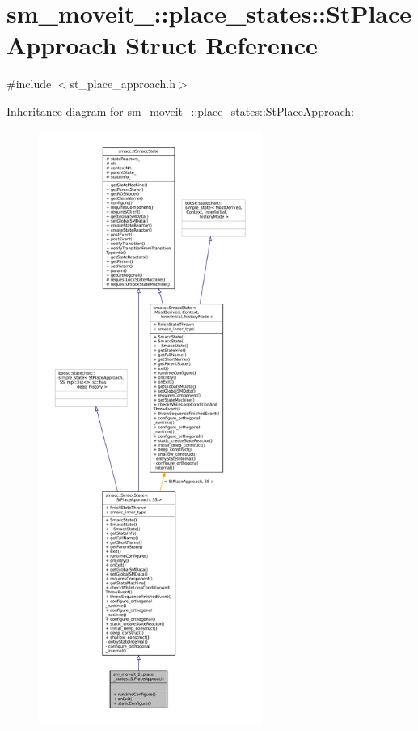 \hypertarget{structsm__moveit__2_1_1place__states_1_1StPlaceApproach}{}\section{sm\+\_\+moveit\+\_\+:\+:place\+\_\+states\+:\+:St\+Place\+Approach Struct Reference}
\label{structsm__moveit__2_1_1place__states_1_1StPlaceApproach}


{\ttfamily \#include $<$st\+\_\+place\+\_\+approach.\+h$>$}



Inheritance diagram for sm\+\_\+moveit\+\_\+:\+:place\+\_\+states\+:\+:St\+Place\+Approach\+:
\nopagebreak
\begin{figure}[H]
\begin{center}
\leavevmode
\includegraphics[height=550pt]{structsm__moveit__2_1_1place__states_1_1StPlaceApproach__inherit__graph}
\end{center}
\end{figure}


